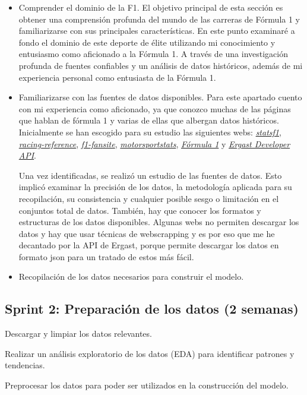 \begin{itemize}
\item
Comprender el dominio de la F1.
El objetivo principal de esta sección es obtener una comprensión profunda del mundo de las carreras de Fórmula 1 y familiarizarse con sus principales características. En este punto examinaré a fondo el dominio de este deporte de élite utilizando mi conocimiento y entusiasmo como aficionado a la Fórmula 1.
A través de una investigación profunda de fuentes confiables y un análisis de datos históricos, además de mi experiencia personal como entusiasta de la Fórmula 1.
\item
Familiarizarse con las fuentes de datos disponibles.
Para este apartado cuento con mi experiencia como aficionado, ya que conozco muchas de las páginas que hablan de fórmula 1 y varias de ellas que albergan datos históricos. Inicialmente se han escogido para su estudio las siguientes webs: \href{https://www.statsf1.com/}{\textit{statsf1}}, \href{https://www.racing-reference.info/}{\textit{racing-reference}}, \href{https://www.f1-fansite.com/}{\textit{f1-fansite}},  \href{https://www.motorsportstats.com/}{\textit{motorsportstats}}, \href{https://www.formula1.com/}{\textit{Fórmula 1}} y \href{https://ergast.com/mrd/}{\textit{Ergast Developer API}}. 

Una vez identificadas, se realizó un estudio de las fuentes de datos. Esto implicó examinar la precisión de los datos, la metodología aplicada para su recopilación, su consistencia y cualquier posible sesgo o limitación en el conjuntos total de datos. También, hay que conocer los formatos y estructuras de los datos disponibles. Algunas webs no permiten descargar los datos y hay que usar técnicas de webscrapping y es por eso que me he decantado por la API de Ergast, porque permite descargar los datos en formato json para un tratado de estos más fácil.
\item
Recopilación de los datos necesarios para construir el modelo.
\end{itemize}


\subsection{Sprint 2: Preparación de los datos (2 semanas)}

Descargar y limpiar los datos relevantes.

Realizar un análisis exploratorio de los datos (EDA) para identificar patrones y tendencias.

Preprocesar los datos para poder ser utilizados en la construcción del modelo.

